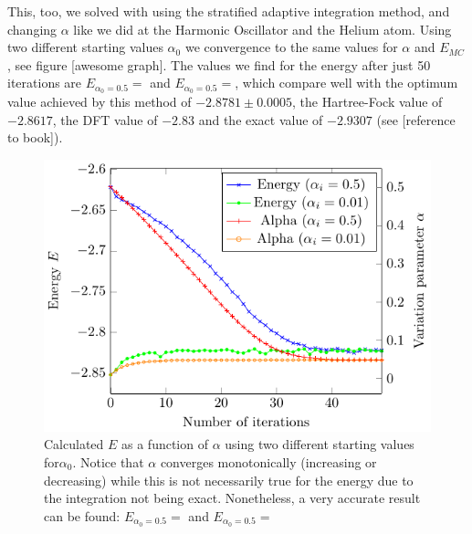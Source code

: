 This, too, we solved with using the stratified adaptive integration method, and changing $\alpha$ like we did at the Harmonic Oscillator and the Helium atom. Using two different starting values $\alpha_0$ we convergence to the same values for $\alpha$ and $E_{MC}$, see figure [awesome graph]. The values we find for the energy after just 50 iterations are $E_{\alpha_0 = 0.5} =  $ and $E_{\alpha_0 = 0.5} =  $, which compare well with the optimum value achieved by this method of $-2.8781 \pm 0.0005$, the Hartree-Fock value of $-2.8617$, the DFT value of $-2.83$ and the exact value of $-2.9307$ (see [reference to book]). 

\begin{figure}
  \begin{center}
  \includegraphics[scale=1 ]{graphs/he-e-alpha-iterations.pdf}
  \caption{Calculated $E$ as a function of $\alpha$ using two different starting values for$\alpha_0$. Notice that $\alpha$ converges monotonically (increasing or decreasing) while this is not necessarily true for the energy due to the integration not being exact. Nonetheless, a very accurate result can be found: $E_{\alpha_0 = 0.5} =  $ and $E_{\alpha_0 = 0.5} =  $}
  \label{fig:He_it}
  \end{center}
\end{figure}
 
